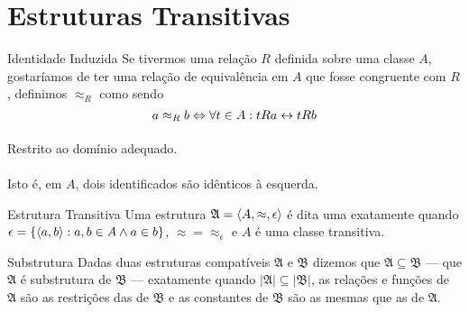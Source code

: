     \section{Estruturas Transitivas}
        \begin{definition}{Identidade Induzida}
            Se tivermos uma relação $R$ definida sobre uma 
            classe $A$, gostaríamos de ter uma relação de 
            equivalência em $A$ que fosse congruente com 
            $R$, definimos $\approx_R$ como sendo
            $$ a \approx_R b \Leftrightarrow \forall t\in A: tRa\leftrightarrow tRb$$
            \paragraph{}
                Restrito ao domínio adequado.
        \paragraph{}
            Isto é, em $A$, dois identificados são idênticos à 
            esquerda.
        \end{definition}
        \begin{definition}{Estrutura Transitiva}
            Uma estrutura $\mathfrak{A} = \TUPLE{A}{\approx}{\epsilon{}}$
            é dita uma  exatamente quando 
            $\epsilon = \SET{\TUPLE{a,b}: a,b\in A\land a\in b}$, $\approx{}\!\!\!=\!\!\!{}\approx_\epsilon$ 
            e $A$ é uma classe transitiva.
        \end{definition}
        \begin{definition}{Substrutura}
            Dadas duas estruturas compatíveis
            $\mathfrak{A}$ e $\mathfrak{B}$ 
            dizemos que $\mathfrak{A}\subseteq\mathfrak{B}$ --- que $\mathfrak{A}$ 
            é substrutura de $\mathfrak{B}$ --- exatamente quando 
            $|\mathfrak{A}|\subseteq|\mathfrak{B}|$, as relações e funções de 
            $\mathfrak{A}$ são as restrições das de $\mathfrak{B}$ e as 
            constantes de $\mathfrak{B}$ são as mesmas que as de $\mathfrak{A}$.
        \end{definition}
